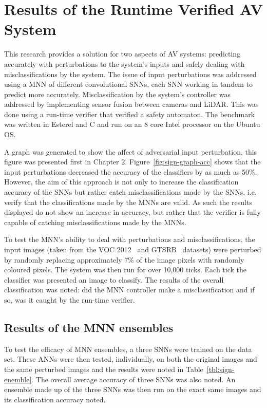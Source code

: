 \section{Results of the Runtime Verified AV System}

This research provides a solution for two aspects of \acf{AV} systems: predicting accurately with perturbations to the system's inputs and safely dealing with misclassifications by the system.
The issue of input perturbations was addressed using a \acf{MNN} of different convolutional \acfp{SNN}, each \ac{SNN} working in tandem to predict more accurately.
Misclassification by the system's controller was addressed by implementing sensor fusion between cameras and \ac{LiDAR}.
This was done using a run-time verifier that verified a safety automaton.
The benchmark was written in Esterel and C and run on an 8 core Intel processor on the Ubuntu OS.

A graph was generated to show the affect of adversarial input perturbation, this figure was presented first in Chapter 2.
Figure~\ref{fig:sign-graph-acc} shows that the input perturbations decreased the accuracy of the classifiers by as much as 50\%.
However, the aim of this approach is not only to increase the classification accuracy of the \acp{SNN} but rather catch misclassifications made by the \acp{SNN}, i.e. verify that the classifications made by the \acp{MNN} are valid.
As such the results displayed do not show an increase in accuracy, but rather that the verifier is fully capable of catching misclassifications made by the \acp{MNN}.

To test the \ac{MNN}'s ability to deal with perturbations and misclassifications, the input images (taken from the \ac{VOC} 2012~\cite{pascal-voc-2012} and \ac{GTSRB}~\cite{Stallkamp2012-gtsrb} datasets) were perturbed by randomly replacing approximately 7\% of the image pixels with randomly coloured pixels.
The system was then run for over 10,000 ticks.
Each tick the classifier was presented an image to classify. 
The results of the overall classification was noted: did the \ac{MNN} controller make a misclassification and if so, was it caught by the run-time verifier.

\subsection{Results of the \ac{MNN} ensembles}
To test the efficacy of \ac{MNN} ensembles, a three \acp{SNN} were trained on the data set.
These \acp{ANN} were then tested, individually, on both the original images and the same perturbed images and the results were noted in Table~\ref{tbl:sign-enemble}.
The overall average accuracy of three \acp{SNN} was also noted.
An ensemble made up of the three \acp{SNN} was then run on the exact same images and its classification accuracy noted.

